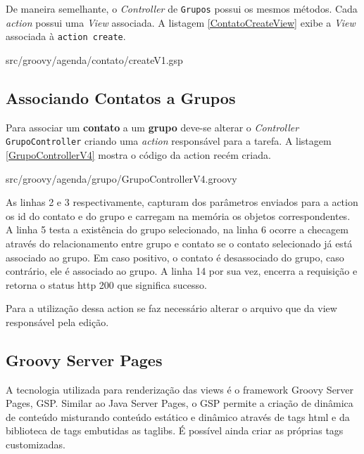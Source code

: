 \documentclass[12pt]{article}
\begin{document}
    De maneira semelhante, o \emph{Controller} de \texttt{Grupos} possui os mesmos métodos. 
    Cada \emph{action} possui uma  \emph{View} associada. A listagem \ref{ContatoCreateView} 
    exibe a \emph{View} associada à \texttt{action create}.
    
    
                   {src/groovy/agenda/contato/createV1.gsp}
    
\subsection{Associando Contatos a Grupos}

    Para associar um \textbf{contato} a um \textbf{grupo} deve-se alterar o \emph{Controller}
    \texttt{GrupoController} criando uma \emph{action} responsável para a tarefa.
    A listagem \ref{GrupoControllerV4} mostra o código da action recém criada.
    
    
                   {src/groovy/agenda/grupo/GrupoControllerV4.groovy}
    
    As linhas 2 e 3 respectivamente, capturam dos parâmetros enviados para a action
    os id do contato e do grupo e carregam na memória os objetos correspondentes.
    A linha 5 testa a existência do grupo selecionado, na linha 6 ocorre a checagem
    através do relacionamento entre grupo e contato se o contato selecionado já está
    associado ao grupo. Em caso positivo, o contato é desassociado do grupo, caso
    contrário, ele é associado ao grupo. A linha 14 por sua vez, encerra a requisição
    e retorna o status http 200 que significa sucesso.
    
    Para a utilização dessa action se faz necessário alterar o arquivo que da view
    responsável pela edição. 

\subsection{Groovy Server Pages}

    A tecnologia utilizada para renderização das views é o framework Groovy Server 
    Pages, GSP. Similar ao Java Server Pages, o GSP permite a criação de dinâmica 
    de conteúdo misturando conteúdo estático e dinâmico através de tags html e da
    biblioteca de tags embutidas as taglibs. É possível ainda criar as próprias tags
    customizadas.
    
\end{document}
